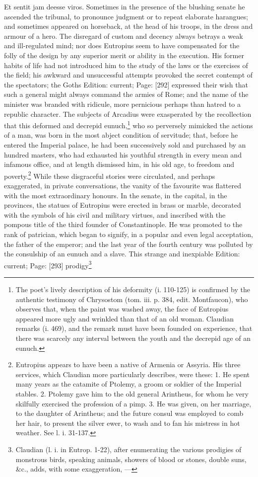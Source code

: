 {Et sentit jam deesse viros.} Sometimes in the presence of the blushing senate he ascended the tribunal, to pronounce judgment or to repeat elaborate harangues; and sometimes appeared on horseback, at the head of his troops, in the dress and armour of a hero. The disregard of custom and decency always betrays a weak and ill-regulated mind; nor does Eutropius seem to have compensated for the folly of the design by any superior merit or ability in the execution. His former habits of life had not introduced him to the study of the laws or the exercises of the field; his awkward and unsuccessful attempts provoked the secret contempt of the spectators; the Goths Edition: current; Page: [292] expressed their wish that such a general might always command the armies of Rome; and the name of the minister was branded with ridicule, more pernicious perhaps than hatred to a republic character. The subjects of Arcadius were exasperated by the recollection that this deformed and decrepid eunuch,\footnote{The poet\texthebrew{}’s lively description of his deformity (i. 110-125) is confirmed by the authentic testimony of Chrysostom (tom. iii. p. 384, edit. Montfaucon), who observes that, when the paint was washed away, the face of Eutropius appeared more ugly and wrinkled than that of an old woman. Claudian remarks (i. 469), and the remark must have been founded on experience, that there was scarcely any interval between the youth and the decrepid age of an eunuch.} who so perversely mimicked the actions of a man, was born in the most abject condition of servitude; that, before he entered the Imperial palace, he had been successively sold and purchased by an hundred masters, who had exhausted his youthful strength in every mean and infamous office, and at length dismissed him, in his old age, to freedom and poverty.\footnote{Eutropius appears to have been a native of Armenia or Assyria. His three services, which Claudian more particularly describes, were these: 1. He spent many years as the catamite of Ptolemy, a groom or soldier of the Imperial stables. 2. Ptolemy gave him to the old general Arintheus, for whom he very skilfully exercised the profession of a pimp. 3. He was given, on her marriage, to the daughter of Arintheus; and the future consul was employed to comb her hair, to present the silver ewer, to wash and to fan his mistress in hot weather. See l. i. 31-137.} While these disgraceful stories were circulated, and perhaps exaggerated, in private conversations, the vanity of the favourite was flattered with the most extraordinary honours. In the senate, in the capital, in the provinces, the statues of Eutropius were erected in brass or marble, decorated with the symbols of his civil and military virtues, and inscribed with the pompous title of the third founder of Constantinople. He was promoted to the rank of patrician, which began to signify, in a popular and even legal acceptation, the father of the emperor; and the last year of the fourth century was polluted by the consulship of an eunuch and a slave. This strange and inexpiable Edition: current; Page: [293] prodigy\footnote{Claudian (l. i. in Eutrop. 1-22), after enumerating the various prodigies of monstrous birds, speaking animals, showers of blood or stones, double suns, \&c., adds, with some exaggeration, \texthebrew{—} }
